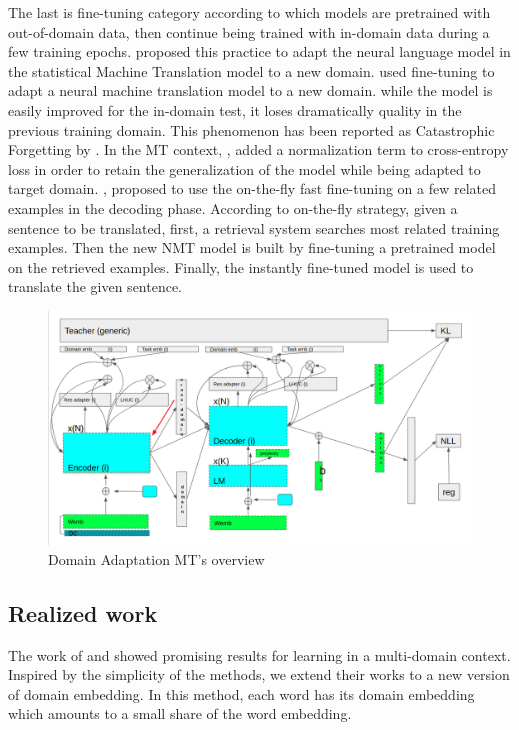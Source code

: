 \documentclass[12pt,a4paper,twoside]{report}
\theoremstyle{definition}
\begin{document}
The last is fine-tuning category according to which models are pretrained with out-of-domain data, then continue being trained with in-domain data during a few training epochs. \cite{Thomas11limsi}  proposed this practice to adapt the neural language model in the statistical Machine Translation model to a new domain. \cite{Luong15stanford} used fine-tuning to adapt a neural machine translation model to a new domain. while the model is easily improved for the in-domain test, it loses dramatically quality in the previous training domain. This phenomenon has been reported as Catastrophic Forgetting by \cite{Michael89catastrophic}. In the MT context, \cite{brian19overcoming}, \cite{khayrallah2018regularized} added
a normalization term to cross-entropy loss in order to retain the generalization of the model while being adapted to target domain. \cite{Farajian17multidomain}, \cite{li2018one} proposed to use the on-the-fly fast fine-tuning on a few related examples in the decoding phase. According to on-the-fly strategy, given a sentence to be translated, first, a retrieval system searches most related training examples. Then the new NMT model is built by fine-tuning a pretrained model on the retrieved examples. Finally, the instantly fine-tuned model is used to translate the given sentence.

\begin{figure}[h]
\includegraphics[scale=0.3]{DA_overview.png}
\caption{Domain Adaptation MT's overview}
\label{fig:overview}
\end{figure}

\subsection*{Realized work}
The work of \cite{Kobus17domain} and \cite{Daume07frustratingly} showed promising results for learning in a multi-domain context. Inspired by the simplicity of the methods, we extend their works to a new version of domain embedding. In this method, each word has its domain embedding which amounts to a small share of the word embedding. 
\end{document}
